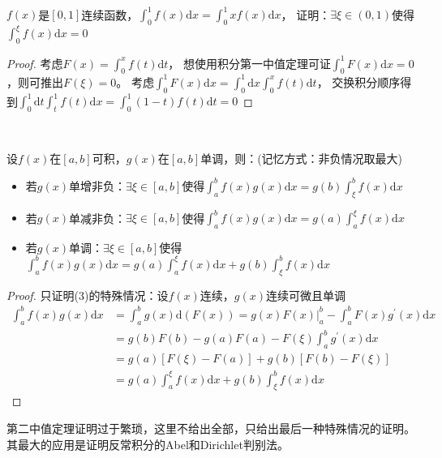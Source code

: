 ~

\begin{exercise}
  $f(x)$是$[0,1]$连续函数，$\int_0^1f(x)\mathrm{d}x = \int_0^1 xf(x)\mathrm{d}x$，
  证明：$\exists \xi \in (0,1)$使得$\int_0^{\xi}f(x)\mathrm{d}x = 0$
\end{exercise}

\begin{proof}
  考虑$F(x) = \int_0^x f(t)\mathrm{d}t$，
  想使用积分第一中值定理可证$\int_0^1 F(x)\mathrm{d}x = 0$，则可推出$F(\xi) = 0$。
  考虑$\int_0^1 F(x)\mathrm{d}x = \int_0^1 \mathrm{d}x \int_0^x f(t)\mathrm{d}t$，
  交换积分顺序得到$\int_0^1 \mathrm{d}t \int_t ^1 f(t) \mathrm{d}x = \int_0^1 (1 - t)f(t)\mathrm{d}t = 0$
\end{proof}


~

\begin{theorem}[积分第二中值定理]
  设$f(x)$在$[a,b]$可积，$g(x)$在$[a,b]$单调，则：(记忆方式：非负情况取最大)
  \begin{itemize}
  \item 若$g(x)$单增非负：$\exists \xi \in [a,b]$使得$\int_a^b f(x)g(x)\mathrm{d}x = g(b) \int_{\xi}^b f(x)\mathrm{d}x$
  \item 若$g(x)$单减非负：$\exists \xi \in [a,b]$使得$\int_a^b f(x)g(x)\mathrm{d}x = g(a) \int_a^{\xi} f(x)\mathrm{d}x$
  \item 若$g(x)$单调：$\exists \xi \in [a,b]$使得$\int_a^b f(x)g(x)\mathrm{d}x = g(a)\int_a^{\xi} f(x)\mathrm{d}x + g(b) \int_{\xi}^bf(x)\mathrm{d}x$
  \end{itemize}
\end{theorem}

\begin{proof}
  只证明(3)的特殊情况：设$f(x)$连续，$g(x)$连续可微且单调
  \begin{align*}
    \int_a^b f(x) g(x) \mathrm{d}x &= \int _a^b g(x) \mathrm{d}(F(x)) = g(x) F(x) |_a^b - \int_a^b F(x) g^{\prime}(x)\mathrm{d}x\\
                          & = g(b)F(b) - g(a) F(a) - F(\xi) \int_a^b g^{\prime}(x)\mathrm{d}x\\
                          & = g(a)[F(\xi) - F(a)] + g(b)[F(b) - F(\xi)]\\
    & = g(a) \int_a^{\xi}f(x)\mathrm{d}x + g(b) \int_{\xi}^b f(x)\mathrm{d}x
  \end{align*}
\end{proof}

\begin{note}
  第二中值定理证明过于繁琐，这里不给出全部，只给出最后一种特殊情况的证明。其最大的应用是证明反常积分的Abel和Dirichlet判别法。
\end{note}

